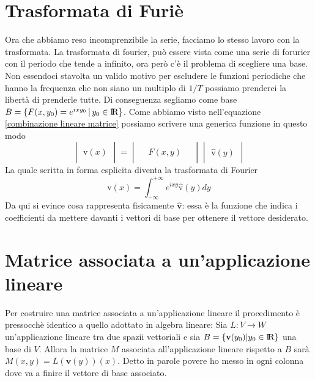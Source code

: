 \documentclass[11pt,a4paper]{report}
\newcommand{\vettore}[1]{\mathbf{#1}}
\newcommand{\vettorec}[1]{\textrm{#1}}
\theoremstyle{definition}
\theoremstyle{plain}
\theoremstyle{plain}
\begin{document}
		\section{Trasformata di Furiè}
			Ora che abbiamo reso incomprenzibile la serie, facciamo lo stesso lavoro con la trasformata.\newline \newline
			La trasformata di fourier, può essere vista come una serie di forurier con il periodo che tende a infinito, ora però c'è il problema di scegliere una base.\newline
			Non essendoci stavolta un valido motivo per escludere le funzioni periodiche che hanno la frequenza che non siano un multiplo di $1/T$ possiamo prenderci la libertà di prenderle tutte. Di conseguenza segliamo come base $B=\{F(x,y_0)=e^{ixy_0}\,|\,y_0 \in \rm I\!R \}$.\newline
			Come abbiamo visto nell'equazione \ref{combinazione lineare matrice} possiamo scrivere una generica funzione in questo modo
			\begin{equation}
				\begin{vmatrix}
					\\
					\vettorec v(x)\\
					\quad
				\end{vmatrix}
				=
				\begin{vmatrix}
					\, & & \, \\
					& F(x,y) & \\
					& & 
				\end{vmatrix}
				\begin{vmatrix}
					\\
					\hat{\vettorec v}(y)\\
					\quad
				\end{vmatrix}
			\end{equation}
			La quale scritta in forma esplicita diventa la trasformata di Fourier
			\begin{equation}
			\vettorec v(x)=\int_{-\infty}^{+\infty} e^{ixy}\hat{\vettorec v}(y) dy
			\end{equation}
			Da qui si evince cosa rappresenta fisicamente $\hat{\vettore v}$: essa è la funzione che indica i coefficienti da mettere davanti i vettori di base per ottenere il vettore desiderato.




		\section{Matrice associata a un'applicazione lineare}
			Per costruire una matrice associata a un'applicazione lineare il procedimento è pressocchè identico a quello adottato in algebra lineare:\newline
			Sia $L:V\rightarrow W$ un'applicazione lineare tra due spazii vettoriali e sia $B=\{\vettore v(y_0)|y_0\in \rm I\!R\}$ una base di $V$. Allora la matrice $M$ associata all'applicazione lineare rispetto a $B$ sarà $M(x,y)=L(\vettore v(y))(x)$.\newline
			Detto in parole povere ho messo in ogni colonna dove va a finire il vettore di base associato.\newline
\end{document}

